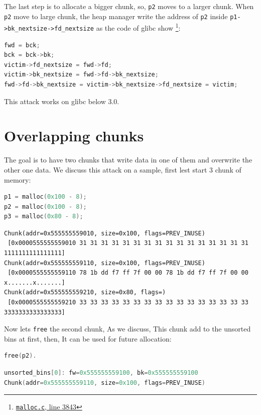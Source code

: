 \documentclass{masterthesis}
\newcommand*\libc{glibc}
\newcommand*\ub{unsorted bins}
\newcommand*\freec{\lstinline{free}}
\begin{document}
The last step is to allocate a bigger chunk, so, \lstinline{p2} moves to a larger chunk. When \lstinline{p2} move to large chunk, the heap manager write the address of \lstinline{p2} inside \lstinline{p1->bk_nextsize->fd_nextsize} as the code of \libc{} show \footnote{\href{https://sourceware.org/git/?p=glibc.git;a=blob;f=malloc/malloc.c;h=f7cd29bc2f93e1082ee77800bd64a4b2a2897055;hb=9ea3686266dca3f004ba874745a4087a89682617\#l3843}{\texttt{malloc.c}, line 3843}}:

\begin{lstlisting}[language=c,frame=tlrb]
fwd = bck;
bck = bck->bk;
victim->fd_nextsize = fwd->fd;
victim->bk_nextsize = fwd->fd->bk_nextsize;
fwd->fd->bk_nextsize = victim->bk_nextsize->fd_nextsize = victim;
 \end{lstlisting}

This attack works on \libc{} below 3.0.

\section{Overlapping chunks}
The goal is to have two chunks that write data in one of them and overwrite the other one data. We discuss this attack on a sample, first lest start 3 chunk of memory:

\begin{lstlisting}[language=c,frame=tlrb]
p1 = malloc(0x100 - 8);
p2 = malloc(0x100 - 8);
p3 = malloc(0x80 - 8);
 \end{lstlisting}

\begin{lstlisting}[frame=tlrb]
Chunk(addr=0x555555559010, size=0x100, flags=PREV_INUSE)
 [0x0000555555559010 31 31 31 31 31 31 31 31 31 31 31 31 31 31 31 31 1111111111111111]
Chunk(addr=0x555555559110, size=0x100, flags=PREV_INUSE)
 [0x0000555555559110 78 1b dd f7 ff 7f 00 00 78 1b dd f7 ff 7f 00 00 x.......x.......]
Chunk(addr=0x555555559210, size=0x80, flags=)
 [0x0000555555559210 33 33 33 33 33 33 33 33 33 33 33 33 33 33 33 33 3333333333333333]
 \end{lstlisting}

Now lets \freec{} the second chunk, As we discuss, This chunk add to the \ub{} at first, then, It can be used for future allocation:

\begin{lstlisting}[language=c,frame=tlrb]
free(p2).
 \end{lstlisting}

\begin{lstlisting}[language=c,frame=tlrb]
unsorted_bins[0]: fw=0x555555559100, bk=0x555555559100
Chunk(addr=0x555555559110, size=0x100, flags=PREV_INUSE)
\end{lstlisting}
\end{document}
